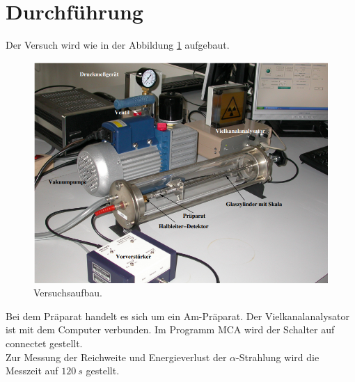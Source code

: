 \section{Durchführung}
\label{sec:Durchführung}
Der Versuch wird wie in der Abbildung \ref{fig:Aufbau} aufgebaut.
\begin{figure}
    \centering
    \includegraphics[scale=0.5]{content/Aufbau 701.png}
    \caption{Versuchsaufbau.}
    \label{fig:Aufbau}
\end{figure}
Bei dem Präparat handelt es sich um ein Am-Präparat. Der Vielkanalanalysator ist mit dem Computer verbunden.
Im Programm MCA wird der Schalter auf connectet gestellt.\\


\noindent Zur Messung der Reichweite und Energieverlust der $\alpha$-Strahlung wird die Messzeit auf $\qty{120}{s}$ gestellt.

